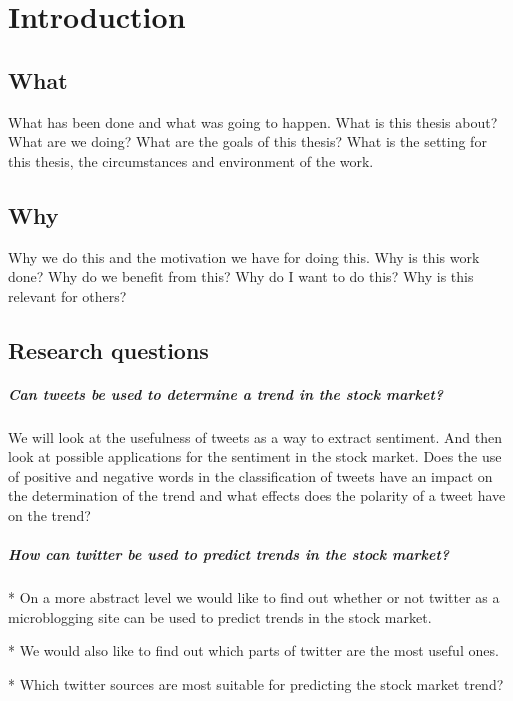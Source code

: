 \chapter{Introduction}

\section{What}
What has been done and what was going to happen.
What is this thesis about? What are we doing? What are the goals of this
thesis? What is the setting for this thesis, the circumstances and environment
of the work. 

\section{Why}
Why we do this and the motivation we have for doing this.
Why is this work done? Why do we benefit from this? Why do I want to do this?
Why is this relevant for others? 

\section{Research questions}
	\paragraph{Can tweets be used to determine a trend in the stock market?\\}
	We will look at the usefulness of tweets as a way to extract sentiment. And
then look at possible applications for the sentiment in the stock market. 
Does the use of positive and negative words in the classification of tweets
have an impact on the determination of the trend and what effects does the
polarity of a tweet have on the trend?

	\paragraph{How can twitter be used to predict trends in the stock market?\\}
* On a more abstract level we would like to find out whether or not twitter as a
microblogging site can be used to predict trends in the stock market.

* We would also like to find out which parts of twitter are the most useful
ones. 

* Which twitter sources are most suitable for predicting the stock market
trend?

